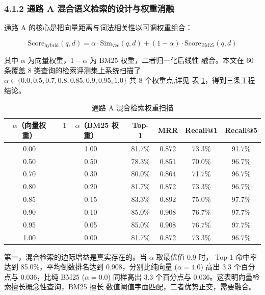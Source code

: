 \documentclass[a4paper]{article}
\newcommand{\song}{\CJKfamily{song}}
\newcommand{\wuhao}{\fontsize{10.5pt}{18pt}\selectfont}
\theoremstyle{definition}
\theoremstyle{plain}
\theoremstyle{remark}
\newcommand{\reftab}[1]{表 \ref{#1}}
\begin{document}
\subsubsection*{4.1.2 \quad 通路 A 混合语义检索的设计与权重消融}

通路 A 的核心是把向量距离与词法相关性以可调权重组合：

\begin{equation}
    \mathrm{Score}_{\mathrm{hybrid}}(q, d) =
        \alpha \cdot \mathrm{Sim}_{\mathrm{vec}}(q, d) +
        (1 - \alpha) \cdot \mathrm{Score}_{\mathrm{BM25}}(q, d)
\end{equation}

其中 $\alpha$ 为向量权重，$1 - \alpha$ 为 BM25 权重，二者归一化后线性
融合。本文在 60 条覆盖 8 类查询的检索评测集上系统扫描了 $\alpha \in
\{0.0, 0.5, 0.7, 0.8, 0.85, 0.9, 0.95, 1.0\}$ 共 8 个权重点,详见
\reftab{tab:rag-weight-sweep}，得到三条工程结论。

\begin{table}[!ht]
    \centering
    \caption{通路 A 混合检索权重扫描}
    \label{tab:rag-weight-sweep}
    \song\wuhao
    \begin{tabular}{cccccc}
        \toprule
        $\alpha$（向量权重） & $1-\alpha$（BM25 权重） & Top-1 & MRR & Recall@1 & Recall@5 \\
        \midrule
        0.00 & 1.00 & 81.7\% & 0.872 & 73.3\% & 91.7\% \\
        0.50 & 0.50 & 78.3\% & 0.851 & 70.0\% & 96.7\% \\
        0.70 & 0.30 & 80.0\% & 0.864 & 71.7\% & 96.7\% \\
        0.80 & 0.20 & 81.7\% & 0.872 & 73.3\% & 96.7\% \\
        0.85 & 0.15 & 83.3\% & 0.892 & 75.0\% & 97.7\% \\
        0.90 & 0.10 & 85.0\% & 0.908 & 76.7\% & 97.7\% \\
        0.95 & 0.05 & 85.0\% & 0.908 & 76.7\% & 97.7\% \\
        1.00 & 0.00 & 81.7\% & 0.872 & 73.3\% & 96.7\% \\
        \bottomrule
    \end{tabular}
\end{table}

第一，混合检索的边际增益是真实存在的。当 $\alpha$ 取最优值 0.9 时，
Top-1 命中率达到 85.0\%，平均倒数排名达到 0.908，分别比纯向量
($\alpha = 1.0$) 高出 3.3 个百分点与 0.036，比纯 BM25 ($\alpha = 0.0$)
同样高出 3.3 个百分点与 0.036。这表明向量检索擅长概念性查询，BM25 擅长
数值阈值字面匹配，二者优势正交，需要融合。
\end{document}
